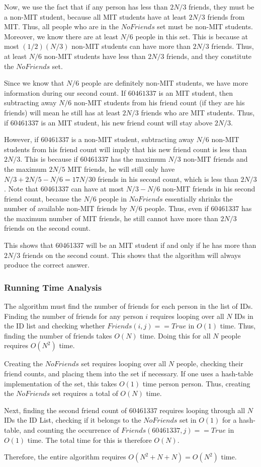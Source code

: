 \documentclass{6046}
\begin{document}
Now, we use the fact that if any person has less than $2N/3$ friends, they must be a non-MIT student, because all MIT students have at least $2N/3$ friends from MIT. Thus, all people who are in the $NoFriends$ set must be non-MIT students. Moreover, we know there are at least $N/6$ people in this set. This is because at most $(1/2) (N/3)$ non-MIT students can have more than $2N/3$ friends. Thus, at least $N/6$ non-MIT students have less than $2N/3$ friends, and they constitute the $NoFriends$ set. 

Since we know that $N/6$ people are definitely non-MIT students, we have more information during our second count. If $60461337$ is an MIT student, then subtracting away $N/6$ non-MIT students from his friend count (if they are his friends) will mean he still has at least $2N/3$ friends who are MIT students. Thus, if $60461337$ is an MIT student, his new friend count will stay above $2N/3$.

However, if $60461337$ is a non-MIT student, subtracting away $N/6$ non-MIT students from his friend count will imply that his new friend count is less than $2N/3$. This is because if 60461337 has the maximum $N/3$ non-MIT friends and the maximum $2N/5$ MIT friends, he will still only have $N/3 + 2N/5 - N/6 = 17N/30$ friends in his second count, which is less than $2N/3$. Note that  60461337 can have at most $N/3 - N/6$ non-MIT friends in his second friend count, because the $N/6$ people in $NoFriends$ essentially shrinks the number of available non-MIT friends by $N/6$ people. Thus, even if 60461337 has the maximum number of MIT friends, he still cannot have more than $2N/3$ friends on the second count.

This shows that 60461337 will be an MIT student if and only if he has more than $2N/3$ friends on the second count. This shows that the algorithm will always produce the correct answer. 

\subsubsection*{Running Time Analysis}

The algorithm must find the number of friends for each person in the list of IDs. Finding the number of friends for any person $i$ requires looping over all $N$ IDs in the ID list and checking whether $Friends(i,j) == True$ in $O(1)$ time. Thus, finding the number of friends takes $O(N)$ time. Doing this for all $N$ people requires $O(N^2)$ time. 

Creating the $NoFriends$ set requires looping over all $N$ people, checking their friend counts, and placing them into the set if necessary. If one uses a hash-table implementation of the set, this takes $O(1)$ time person person. Thus, creating the $NoFriends$ set requires a total of $O(N)$ time.

Next, finding the second friend count of 60461337 requires looping through all $N$ IDs the ID List, checking if it belongs to the $NoFriends$ set in $O(1)$ for a hash-table, and counting the occurrence of $Friends(60461337, j) == True$ in $O(1)$ time. The total time for this is therefore $O(N)$. 

Therefore, the entire algorithm requires $O(N^2 + N +  N) = O(N^2)$ time. 
\end{document}
